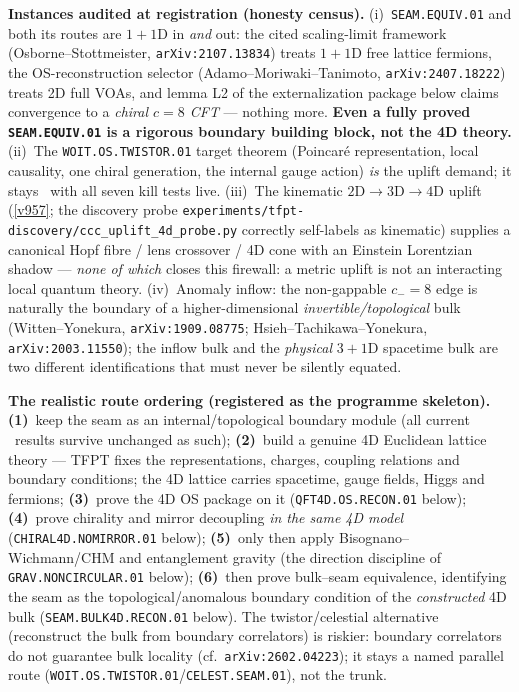\documentclass[11pt,a4paper]{article}
\begin{document}
\par\smallskip\noindent\textbf{Instances audited at registration (honesty census).}
(i)~\texttt{SEAM.EQUIV.01} and both its routes are $1{+}1$D in \emph{and} out: the cited
scaling-limit framework (Osborne--Stottmeister, \texttt{arXiv:2107.13834}) treats $1{+}1$D free
lattice fermions, the OS-reconstruction selector (Adamo--Moriwaki--Tanimoto,
\texttt{arXiv:2407.18222}) treats 2D full VOAs, and lemma L2 of the externalization package
below claims convergence to a \emph{chiral $c{=}8$ CFT} --- nothing more.  \textbf{Even a fully
proved \texttt{SEAM.EQUIV.01} is a rigorous boundary building block, not the 4D theory.}
(ii)~The \texttt{WOIT.OS.TWISTOR.01} target theorem (Poincar\'e representation, local causality,
one chiral generation, the internal gauge action) \emph{is} the uplift demand; it stays \mO\ with
all seven kill tests live.
(iii)~The kinematic $2\mathrm D\to3\mathrm D\to4\mathrm D$ uplift (\vref{v957}; the discovery
probe \texttt{experiments/tfpt-discovery/ccc\_uplift\_4d\_probe.py} correctly self-labels as
kinematic) supplies a canonical Hopf fibre / lens crossover / 4D cone with an Einstein Lorentzian
shadow --- \emph{none of which} closes this firewall: a metric uplift is not an interacting local
quantum theory.
(iv)~Anomaly inflow: the non-gappable $c_-{=}8$ edge is naturally the boundary of a
higher-dimensional \emph{invertible/topological} bulk (Witten--Yonekura,
\texttt{arXiv:1909.08775}; Hsieh--Tachikawa--Yonekura, \texttt{arXiv:2003.11550}); the inflow
bulk and the \emph{physical} $3{+}1$D spacetime bulk are two different identifications that must
never be silently equated.

\par\smallskip\noindent\textbf{The realistic route ordering (registered as the programme
skeleton).}
\textbf{(1)}~keep the seam as an internal/topological boundary module (all current \mE\ results
survive unchanged as such);
\textbf{(2)}~build a genuine 4D Euclidean lattice theory --- TFPT fixes the representations,
charges, coupling relations and boundary conditions; the 4D lattice carries spacetime, gauge
fields, Higgs and fermions;
\textbf{(3)}~prove the 4D OS package on it (\texttt{QFT4D.OS.RECON.01} below);
\textbf{(4)}~prove chirality and mirror decoupling \emph{in the same 4D model}
(\texttt{CHIRAL4D.NOMIRROR.01} below);
\textbf{(5)}~only then apply Bisognano--Wichmann/CHM and entanglement gravity (the direction
discipline of \texttt{GRAV.NONCIRCULAR.01} below);
\textbf{(6)}~then prove bulk--seam equivalence, identifying the seam as the topological/anomalous
boundary condition of the \emph{constructed} 4D bulk (\texttt{SEAM.BULK4D.RECON.01} below).
The twistor/celestial alternative (reconstruct the bulk from boundary correlators) is riskier:
boundary correlators do not guarantee bulk locality (cf.\ \texttt{arXiv:2602.04223}); it stays a
named parallel route (\texttt{WOIT.OS.TWISTOR.01}/\texttt{CELEST.SEAM.01}), not the trunk.
\end{document}
